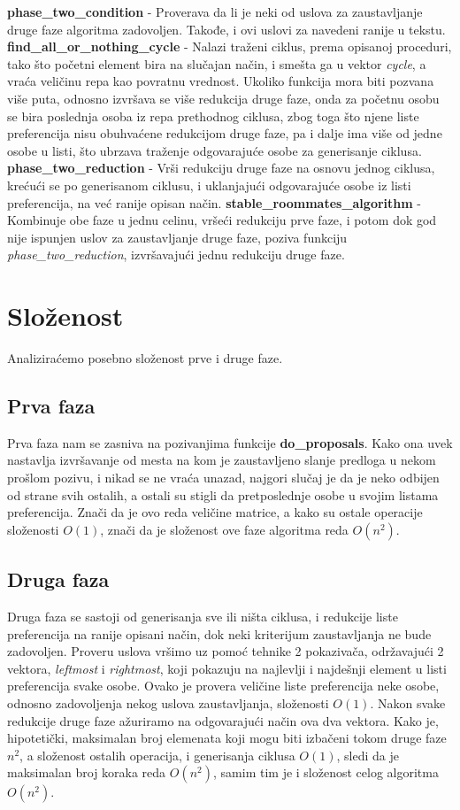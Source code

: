 \documentclass[a4paper]{article}
\begin{document}
\textbf{phase\_two\_condition} - Proverava da li je neki od uslova za zaustavljanje druge faze algoritma zadovoljen. Takođe, i ovi uslovi za navedeni ranije u tekstu.
\newline
\textbf{find\_all\_or\_nothing\_cycle} - Nalazi traženi ciklus, prema opisanoj proceduri, tako što početni element bira na slučajan način, i smešta ga u vektor \textit{cycle}, a vraća veličinu repa kao povratnu vrednost. Ukoliko funkcija mora biti pozvana više puta, odnosno izvršava se više redukcija druge faze, onda za početnu osobu se bira poslednja osoba iz repa prethodnog ciklusa, zbog toga što njene liste preferencija nisu obuhvaćene redukcijom druge faze, pa i dalje ima više od jedne osobe u listi, što ubrzava traženje odgovarajuće osobe za generisanje ciklusa.
\newline
\textbf{phase\_two\_reduction} - Vrši redukciju druge faze na osnovu jednog ciklusa, krećući se po generisanom ciklusu, i uklanjajući odgovarajuće osobe iz listi preferencija, na već ranije opisan način.
\newline
\textbf{stable\_roommates\_algorithm} - Kombinuje obe faze u jednu celinu, vršeći redukciju prve faze, i potom dok god nije ispunjen uslov za zaustavljanje druge faze, poziva funkciju \textit{phase\_two\_reduction}, izvršavajući jednu redukciju druge faze.

\section{Složenost}
Analiziraćemo posebno složenost prve i druge faze.
\subsection{Prva faza}
Prva faza nam se zasniva na pozivanjima funkcije \textbf{do\_proposals}. Kako ona uvek nastavlja izvršavanje od mesta na kom je zaustavljeno slanje predloga u nekom prošlom pozivu, i nikad se ne vraća unazad, najgori slučaj je da je neko odbijen od strane svih ostalih, a ostali su stigli da pretposlednje osobe u svojim listama preferencija. Znači da je ovo reda veličine matrice, a kako su ostale operacije složenosti $O(1)$, znači da je složenost ove faze algoritma reda $O(n^2)$.
\subsection{Druga faza}
Druga faza se sastoji od generisanja sve ili ništa ciklusa, i redukcije liste preferencija na ranije opisani način, dok neki kriterijum zaustavljanja ne bude zadovoljen. Proveru uslova vršimo uz pomoć tehnike 2 pokazivača, održavajući 2 vektora, \textit{leftmost} i \textit{rightmost}, koji pokazuju na najlevlji i najdešnji element u listi preferencija svake osobe. Ovako je provera veličine liste preferencija neke osobe, odnosno zadovoljenja nekog uslova zaustavljanja, složenosti $O(1)$. Nakon svake redukcije druge faze ažuriramo na odgovarajući način ova dva vektora. Kako je, hipotetički, maksimalan broj elemenata koji mogu biti izbačeni tokom druge faze $n^2$, a složenost ostalih operacija, i generisanja ciklusa $O(1)$, sledi da je maksimalan broj koraka reda $O(n^2)$, samim tim je i složenost celog algoritma $O(n^2)$.
\end{document}
